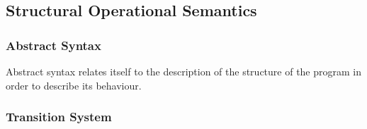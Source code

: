 \subsection{Structural Operational Semantics}

\subsubsection*{Abstract Syntax}
Abstract syntax relates itself to the description of the structure of the program in order to describe its behaviour. 

\subsubsection*{Transition System}